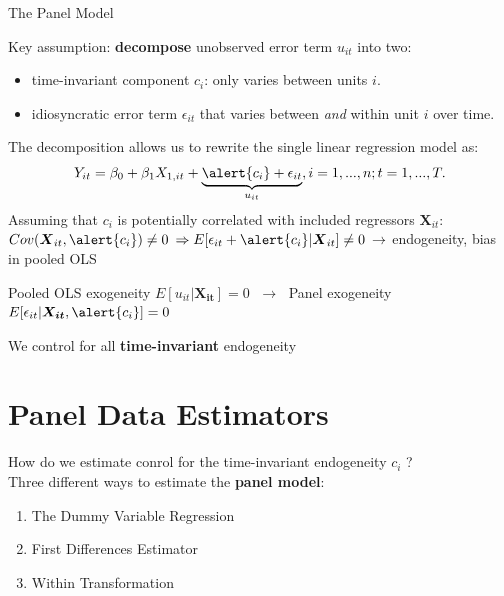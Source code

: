 \documentclass[11pt, aspectratio = 169]{beamer}
\begin{document}
\begin{frame}{The Panel Model}

Key assumption: \textbf{decompose} unobserved error term $u_{it}$ into two:
\begin{itemize}
    \item time-invariant component \alert{$c_i$}: only varies between units $i$.
    \item idiosyncratic error term $\epsilon_{it}$ that varies between \textit{and} within unit $i$ over time.
\end{itemize}
\pause
The decomposition allows us to rewrite the single linear regression model as:
\begin{align*}
       Y_{it} = \beta_0 + \beta_1 X_{1,it} + \underbrace{\alert{c_i} + \epsilon_{it}}_{u_{it}} , i = 1, ... , n; t = 1, ... , T. 
\end{align*}
\pause 
Assuming that \alert{\textbf{$c_i$}} is potentially correlated with included regressors $\boldsymbol{X}_{it}$:  $Cov(\boldsymbol{X}_{it},\alert{c_i}) \neq 0 \: \Rightarrow E[\epsilon_{it}+\alert{c_i}|\boldsymbol{X}_{it}] \neq 0 \: \rightarrow$ endogeneity, bias in pooled OLS
\pause
\begin{center}
    Pooled OLS exogeneity $E[u_{it}|\boldsymbol{X_{it}}] = 0$ 
    $\; \rightarrow \;$ \pause Panel exogeneity $E[\epsilon_{it}|\boldsymbol{X_{it}}, \alert{c_i}] = 0$
\end{center}
\pause
\begin{center}
    We control for all \textbf{time-invariant} endogeneity
\end{center}
\end{frame}

\section{Panel Data Estimators}

\begin{frame}
    How do we estimate conrol for the time-invariant endogeneity \alert{$c_i$} ? \\ \pause 
    Three different ways to estimate the \textbf{panel model}:
    \begin{enumerate}
        \item The Dummy Variable Regression
        \item First Differences Estimator
        \item Within Transformation
    \end{enumerate}
\end{frame}
\end{document}
